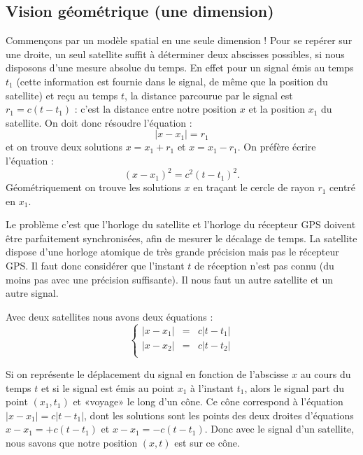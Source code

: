 \documentclass[class=report,crop=false]{standalone}
\begin{document}
\subsection{Vision géométrique (une dimension)}

Commençons par un modèle spatial en une seule dimension !
Pour se repérer sur une droite, un seul satellite suffit à déterminer
deux abscisses possibles, si nous disposons d'une mesure absolue du temps.
En effet pour un signal émis au temps $t_1$ (cette information est fournie 
dans le signal, de même que la position du satellite) et reçu au temps $t$, 
la distance parcourue par le signal est $r_1= c(t-t_1)$ : c'est la distance entre notre position $x$ et 
la position $x_1$ du satellite. On doit donc résoudre l'équation :
$$|x-x_1 | = r_1$$
et on trouve deux solutions $x=x_1+r_1$ et $x=x_1-r_1$.
On préfère écrire l'équation :
$$(x-x_1)^2 =  c^2(t-t_1)^2.$$ 
Géométriquement on trouve les solutions $x$ en traçant le cercle de rayon $r_1$ centré en $x_1$.



Le problème c'est que l'horloge du satellite et l'horloge du récepteur GPS doivent 
être parfaitement synchronisées, afin de mesurer le décalage de temps. La satellite dispose 
d'une horloge atomique de très grande précision mais pas le récepteur GPS.
Il faut donc considérer que l'instant $t$ de réception n'est pas connu 
(du moins pas avec une précision suffisante). Il nous faut un autre satellite et un autre signal.

Avec deux satellites nous avons deux équations :
$$\left\{\begin{array}{rcl} 
         |x-x_1| &=& c |t-t_1| \\  
         |x-x_2| &=& c |t-t_2| \\ 
         \end{array}
 \right.$$
 
Si on représente le déplacement du signal en fonction de l'abscisse $x$ au cours du temps $t$ et 
si le signal est émis au point $x_1$ à l'instant $t_1$, alors le signal
part du point $(x_1,t_1)$ et «voyage» le long d'un cône.
Ce cône correspond à l'équation $|x-x_1| = c |t-t_1|$, dont les solutions sont
les points des deux droites d'équations $x-x_1 = + c(t-t_1)$ et
$x-x_1 = - c(t-t_1)$.
Donc avec le signal d'un satellite, nous savons que notre position $(x,t)$ est sur ce cône.

\end{document}
